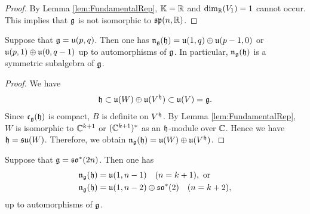 \begin{proof}
	By Lemma \ref{lem:FundamentalRep}, $\mathbb{K} = \mathbb{R}$ and $\dim_{\mathbb{R}}(V_1) = 1$ cannot occur.
	This implies that $\mathfrak{g}$ is not isomorphic to $\mathfrak{sp}(n, \mathbb{R})$.
\end{proof}

\begin{lemma} \label{lem:EmbeddingSUtoSU}
	Suppose that $\mathfrak{g} = \mathfrak{u}(p, q)$.
	Then one has $\mathfrak{n}_{\mathfrak{g}}(\mathfrak{h}) = \mathfrak{u}(1, q) \oplus \mathfrak{u}(p-1, 0)$ or $\mathfrak{u}(p, 1) \oplus \mathfrak{u}(0, q-1)$ up to automorphisms of $\mathfrak{g}$.
	In particular, $\mathfrak{n}_{\mathfrak{g}}(\mathfrak{h})$ is a symmetric subalgebra of $\mathfrak{g}$.
\end{lemma}

\begin{proof}
	We have
	\begin{align*}
		\mathfrak{h} \subset \mathfrak{u}(W) \oplus \mathfrak{u}(V^{\mathfrak{h}}) \subset \mathfrak{u}(V) = \mathfrak{g}.
	\end{align*}
	Since $\mathfrak{c}_{\mathfrak{g}}(\mathfrak{h})$ is compact, $B$ is definite on $V^{\mathfrak{h}}$.
	By Lemma \ref{lem:FundamentalRep}, $W$ is isomorphic to $\mathbb{C}^{k+1}$ or $(\mathbb{C}^{k+1})^*$ as an $\mathfrak{h}$-module over $\mathbb{C}$.
	Hence we have $\mathfrak{h} = \mathfrak{su}(W)$.
	Therefore, we obtain $\mathfrak{n}_{\mathfrak{g}}(\mathfrak{h}) = \mathfrak{u}(W) \oplus \mathfrak{u}(V^{\mathfrak{h}})$.
\end{proof}

\begin{lemma} \label{lem:EmbeddingSUtoSOstar}
	Suppose that $\mathfrak{g} = \mathfrak{so}^*(2n)$.
	Then one has
	\begin{align*}
		\mathfrak{n}_{\mathfrak{g}}(\mathfrak{h}) &= \mathfrak{u}(1, n-1) \quad (n = k+1), \text{ or }\\
		\mathfrak{n}_{\mathfrak{g}}(\mathfrak{h}) &= \mathfrak{u}(1, n-2) \oplus \mathfrak{so}^*(2) \quad (n = k+2),
	\end{align*}
	up to automorphisms of $\mathfrak{g}$.
\end{lemma}

